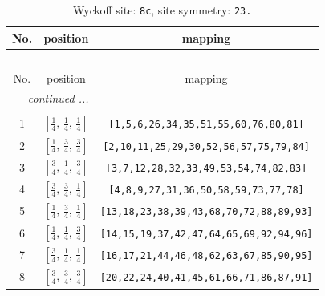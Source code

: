 \documentclass[fleqn,8pt]{jsarticle}
\begin{document}
\begin{longtable}{ccc}
\caption{Wyckoff site: {\tt 8c}, site symmetry: {\tt 23.}}
 \\
 \hline \hline
No. & position & mapping \\ \hline \endfirsthead

\multicolumn{2}{l}{\tablename\ \thetable{}} \\
 \hline \hline
No. & position & mapping \\ \hline \endhead

 \hline \hline
\multicolumn{2}{r}{\footnotesize\it continued ...} \\ \endfoot

 \hline \hline
\multicolumn{2}{r}{} \\ \endlastfoot

1 & $\left[ \frac{1}{4},\, \frac{1}{4},\, \frac{1}{4} \right]$ & {\tt [1,5,6,26,34,35,51,55,60,76,80,81]} \\ \hline
2 & $\left[ \frac{1}{4},\, \frac{3}{4},\, \frac{3}{4} \right]$ & {\tt [2,10,11,25,29,30,52,56,57,75,79,84]} \\ \hline
3 & $\left[ \frac{3}{4},\, \frac{1}{4},\, \frac{3}{4} \right]$ & {\tt [3,7,12,28,32,33,49,53,54,74,82,83]} \\ \hline
4 & $\left[ \frac{3}{4},\, \frac{3}{4},\, \frac{1}{4} \right]$ & {\tt [4,8,9,27,31,36,50,58,59,73,77,78]} \\ \hline
5 & $\left[ \frac{1}{4},\, \frac{3}{4},\, \frac{1}{4} \right]$ & {\tt [13,18,23,38,39,43,68,70,72,88,89,93]} \\ \hline
6 & $\left[ \frac{1}{4},\, \frac{1}{4},\, \frac{3}{4} \right]$ & {\tt [14,15,19,37,42,47,64,65,69,92,94,96]} \\ \hline
7 & $\left[ \frac{3}{4},\, \frac{1}{4},\, \frac{1}{4} \right]$ & {\tt [16,17,21,44,46,48,62,63,67,85,90,95]} \\ \hline
8 & $\left[ \frac{3}{4},\, \frac{3}{4},\, \frac{3}{4} \right]$ & {\tt [20,22,24,40,41,45,61,66,71,86,87,91]} \\
\end{longtable}
\renewcommand{\arraystretch}{1.2}
\end{document}
